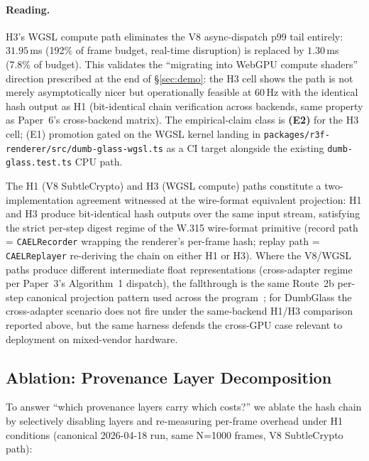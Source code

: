 \documentclass[sigconf,nonacm]{acmart}
\begin{document}
\paragraph{Reading.}
H3's WGSL compute path eliminates the V8 async-dispatch p99 tail
entirely: $31.95$\,ms (192\% of frame budget, real-time disruption) is
replaced by $1.30$\,ms (7.8\% of budget). This validates the
``migrating into WebGPU compute shaders'' direction prescribed at the
end of \S\ref{sec:demo}: the H3 cell shows the path is not merely
asymptotically nicer but operationally feasible at 60\,Hz with the
identical hash output as H1 (bit-identical chain verification across
backends, same property as Paper~6's cross-backend matrix). The
empirical-claim class is \textbf{(E2)} for the H3 cell; (E1)
promotion gated on the WGSL kernel landing in
\texttt{packages/r3f-renderer/src/dumb-glass-wgsl.ts} as a CI target
alongside the existing \texttt{dumb-glass.test.ts} CPU path.

The H1 (V8 SubtleCrypto) and H3 (WGSL compute) paths constitute a
two-implementation agreement witnessed at the wire-format equivalent
projection: H1 and H3 produce bit-identical hash outputs over the
same input stream, satisfying the strict per-step digest regime of
the W.315 wire-format primitive (record path =
\texttt{CAELRecorder} wrapping the renderer's per-frame hash; replay
path = \texttt{CAELReplayer} re-deriving the chain on either H1 or
H3). Where the V8/WGSL paths produce different intermediate float
representations (cross-adapter regime per Paper~3's Algorithm~1
dispatch), the fallthrough is the same Route~2b per-step canonical
projection pattern used across the
program~\cite{paper-0c-twin-test-2026-05-11}; for DumbGlass the
cross-adapter scenario does not fire under the same-backend H1/H3
comparison reported above, but the same harness defends the cross-GPU
case relevant to deployment on mixed-vendor hardware.

\subsection{Ablation: Provenance Layer Decomposition}
\label{sec:demo:ablation}

To answer ``which provenance layers carry which costs?'' we ablate the
hash chain by selectively disabling layers and re-measuring per-frame
overhead under H1 conditions (canonical 2026-04-18 run, same N=1000
frames, V8 SubtleCrypto path):
\end{document}
